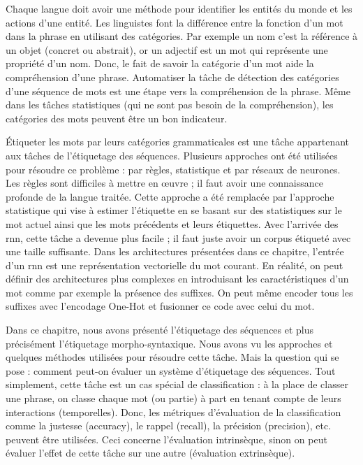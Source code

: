 \documentclass{KodeBook}
\begin{document}
\begin{discussion}
Chaque langue doit avoir une méthode pour identifier les entités du monde et les actions d'une entité. 
Les linguistes font la différence entre la fonction d'un mot dans la phrase en utilisant des catégories. 
Par exemple un nom c'est la référence à un objet (concret ou abstrait), or un adjectif est un mot qui représente une propriété d'un nom. 
Donc, le fait de savoir la catégorie d'un mot aide la compréhension d'une phrase. 
Automatiser la tâche de détection des catégories d'une séquence de mots est une étape vers la compréhension de la phrase. 
Même dans les tâches statistiques (qui ne sont pas besoin de la compréhension), les catégories des mots peuvent être un bon indicateur. 

Étiqueter les mots par leurs catégories grammaticales est une tâche appartenant aux tâches de l'étiquetage des séquences. 
Plusieurs approches ont été utilisées pour résoudre ce problème : par règles, statistique et par réseaux de neurones. 
Les règles sont difficiles à mettre en œuvre ; il faut avoir une connaissance profonde de la langue traitée.
Cette approche a été remplacée par l'approche statistique qui vise à estimer l'étiquette en se basant sur des statistiques sur le mot actuel ainsi que les mots précédents et leurs étiquettes.
Avec l'arrivée des \ac{rnn}, cette tâche a devenue plus facile ; il faut juste avoir un corpus étiqueté avec une taille suffisante. 
Dans les architectures présentées dans ce chapitre, l'entrée d'un \ac{rnn} est une représentation vectorielle du mot courant. 
En réalité, on peut définir des architectures plus complexes en introduisant les caractéristiques d'un mot comme par exemple la présence des suffixes. 
On peut même encoder tous les suffixes avec l'encodage One-Hot et fusionner ce code avec celui du mot. 

Dans ce chapitre, nous avons présenté l'étiquetage des séquences et plus précisément l'étiquetage morpho-syntaxique. 
Nous avons vu les approches et quelques méthodes utilisées pour résoudre cette tâche. 
Mais la question qui se pose : comment peut-on évaluer un système d'étiquetage des séquences. 
Tout simplement, cette tâche est un cas spécial de classification : à la place de classer une phrase, on classe chaque mot (ou partie) à part en tenant compte de leurs interactions (temporelles). 
Donc, les métriques d'évaluation de la classification comme la justesse (accuracy), le rappel (recall), la précision (precision), etc. peuvent être utilisées.
Ceci concerne l'évaluation intrinsèque, sinon on peut évaluer l'effet de cette tâche sur une autre (évaluation extrinsèque).
\end{discussion}

\ifx\wholebook\relax\else
% 
% 
	
\end{document}
